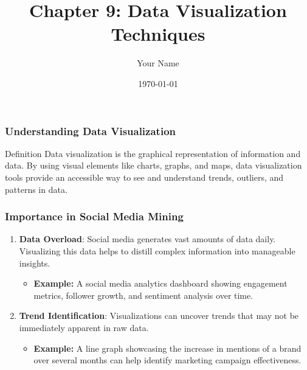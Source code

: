\documentclass{beamer}
\title{Chapter 9: Data Visualization Techniques}
\author{Your Name}
\institute{Your Institution}
\date{\today}
\begin{document}
\frame{\titlepage}

\begin{frame}[fragile]
    \titlepage
\end{frame}

\begin{frame}[fragile]
    \frametitle{Understanding Data Visualization}
    \begin{block}{Definition}
        Data visualization is the graphical representation of information and data. By using visual elements like charts, graphs, and maps, data visualization tools provide an accessible way to see and understand trends, outliers, and patterns in data.
    \end{block}
\end{frame}

\begin{frame}[fragile]
    \frametitle{Importance in Social Media Mining}
    \begin{enumerate}
        \item \textbf{Data Overload}: Social media generates vast amounts of data daily. Visualizing this data helps to distill complex information into manageable insights.
        \begin{itemize}
            \item \textbf{Example:} A social media analytics dashboard showing engagement metrics, follower growth, and sentiment analysis over time.
        \end{itemize}
        
        \item \textbf{Trend Identification}: Visualizations can uncover trends that may not be immediately apparent in raw data.
        \begin{itemize}
            \item \textbf{Example:} A line graph showcasing the increase in mentions of a brand over several months can help identify marketing campaign effectiveness.
        \end{itemize}
    \end{enumerate}
\end{frame}
\end{document}
